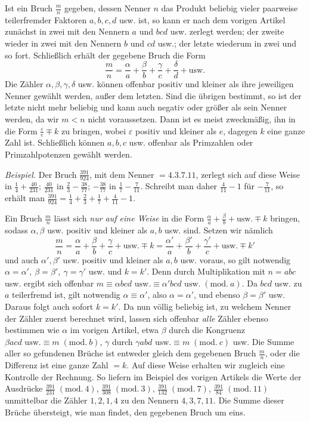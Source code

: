 Ist ein Bruch \(\frac mn\) gegeben, dessen Nenner \(n\) das Produkt beliebig vieler paarweise teilerfremder Faktoren \(a,b,c,d\) usw. ist, so kann er nach dem vorigen Artikel zunächst in zwei mit den Nennern \(a\) und \(bcd\) usw. zerlegt werden; der zweite wieder in zwei mit den Nennern \(b\) und \(cd\) usw.; der letzte wiederum in zwei und so fort. Schließlich erhält der gegebene Bruch die Form \[\frac mn=\frac\alpha a+\frac\beta b+\frac\gamma c+\frac\delta d+\text{usw.}\]
Die Zähler \(\alpha,\beta,\gamma,\delta\) usw. können offenbar positiv und kleiner als ihre jeweiligen Nenner gewählt werden, außer dem letzten. Sind die übrigen bestimmt, so ist der letzte nicht mehr beliebig und kann auch negativ oder größer als sein Nenner werden, da wir \(m<n\) nicht voraussetzen. Dann ist es meist zweckmäßig, ihn in die Form \(\frac\varepsilon e\mp k\) zu bringen, wobei \(\varepsilon\) positiv und kleiner als \(e\), dagegen \(k\) eine ganze Zahl ist. Schließlich können \(a,b,c\) usw. offenbar als Primzahlen oder Primzahlpotenzen gewählt werden.

\textit{Beispiel.} Der Bruch \(\frac{391}{924}\), mit dem Nenner \(=4.3.7.11\), zerlegt sich auf diese Weise in \(\frac14+\frac{40}{231}\); \(\frac{40}{231}\) in \(\frac23-\frac{38}{77}\); \(-\frac{38}{77}\) in \(\frac17-\frac7{11}\). Schreibt man daher \(\frac4{11}-1\) für \(-\frac7{11}\), so erhält man \(\frac{391}{924}=\frac14+\frac23+\frac17+\frac4{11}-1\).

Ein Bruch \(\frac mn\) lässt sich \textit{nur auf eine Weise} in die Form \(\frac\alpha a+\frac\beta b+\text{usw.}\mp k\) bringen, sodass \(\alpha,\beta\) usw. positiv und kleiner als \(a,b\) usw. sind. Setzen wir nämlich \[\frac mn=\frac\alpha a+\frac\beta b+\frac\gamma c+\text{usw.}\mp k=\frac{\alpha'}a+\frac{\beta'}b+\frac{\gamma'}c+\text{usw.}\mp k'\]
und auch \(\alpha',\beta'\) usw. positiv und kleiner als \(a,b\) usw. voraus, so gilt notwendig \(\alpha=\alpha',\ \beta=\beta',\ \gamma=\gamma'\) usw. und \(k=k'\). Denn durch Multiplikation mit \(n=abc\) usw. ergibt sich offenbar \(m\equiv\alpha bcd\text{ usw.}\equiv\alpha'bcd\text{ usw.}\; (\mathrm{mod}.\ a)\). Da \(bcd\) usw. zu \(a\) teilerfremd ist, gilt notwendig \(\alpha\equiv\alpha'\), also \(\alpha=\alpha'\), und ebenso \(\beta=\beta'\) usw. Daraus folgt auch sofort \(k=k'\). Da nun völlig beliebig ist, zu welchem Nenner der Zähler zuerst berechnet wird, lassen sich offenbar \textit{alle} Zähler ebenso bestimmen wie \(\alpha\) im vorigen Artikel, etwa \(\beta\) durch die Kongruenz \(\beta acd\text{ usw.}\equiv m\; (\mathrm{mod}.\ b)\), \(\gamma\) durch \(\gamma abd\text{ usw.}\equiv m\; (\mathrm{mod}.\ c)\) usw. Die Summe aller so gefundenen Brüche ist entweder gleich dem gegebenen Bruch \(\frac mn\), oder die Differenz ist eine ganze Zahl \(=k\). Auf diese Weise erhalten wir zugleich eine Kontrolle der Rechnung. So liefern im Beispiel des vorigen Artikels die Werte der Ausdrücke \(\frac{391}{231}\; (\mathrm{mod}.\ 4)\), \(\frac{391}{308}\; (\mathrm{mod}.\ 3)\), \(\frac{391}{132}\; (\mathrm{mod}.\ 7)\), \(\frac{391}{84}\; (\mathrm{mod}.\ 11)\) unmittelbar die Zähler \(1,2,1,4\) zu den Nennern \(4,3,7,11\). Die Summe dieser Brüche übersteigt, wie man findet, den gegebenen Bruch um eins.
